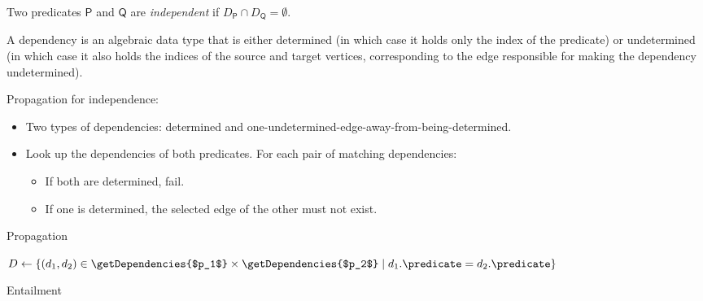 \documentclass[runningheads]{llncs}
\begin{document}
\begin{definition}
  Two predicates $\mathsf{P}$ and $\mathsf{Q}$ are \emph{independent} if
  $D_{\mathsf{P}} \cap D_{\mathsf{Q}} = \emptyset$.
\end{definition}

A dependency is an algebraic data type that is either determined (in which case
it holds only the index of the predicate) or undetermined (in which case it also
holds the indices of the source and target vertices, corresponding to the edge
responsible for making the dependency undetermined).

Propagation for independence:
\begin{itemize}
\item Two types of dependencies: determined and
  one-undetermined-edge-away-from-being-determined.
\item Look up the dependencies of both predicates. For each pair of
  matching dependencies:
  \begin{itemize}
  \item If both are determined, fail.
  \item If one is determined, the selected edge of the other must not
    exist.
  \end{itemize}
\end{itemize}

\begin{algorithm}
  \caption{Propagation}
\end{algorithm}

\begin{algorithm}
  $D \gets \{ (d_1, d_2) \in \getDependencies{$p_1$} \times
  \getDependencies{$p_2$} \mid d_1.\predicate = d_2.\predicate \}$\;
  \;
  \caption{Entailment}
\end{algorithm}
\end{document}
